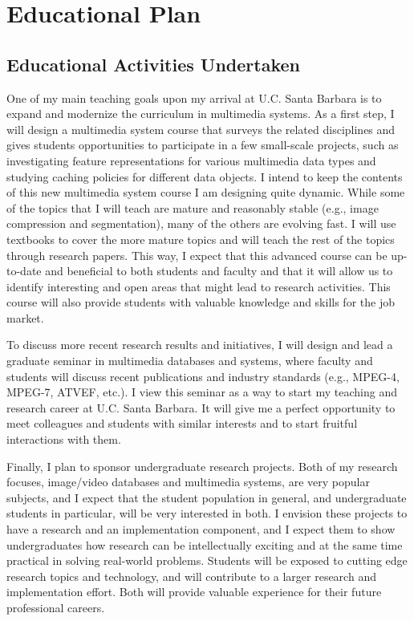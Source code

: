 \section{Educational Plan}

\subsection{Educational Activities Undertaken}

One of my main teaching goals upon my arrival at
U.C. Santa Barbara is to expand and modernize the curriculum in 
multimedia systems. 
As a first step, I will design a multimedia system course
that surveys the related disciplines and gives students opportunities
to participate in a few small-scale projects, such as
investigating feature representations for various multimedia
data types and studying caching policies for different data objects. 
I intend to keep the contents of this new multimedia system 
course I am designing quite dynamic.
While some of the topics that I will teach are mature and 
reasonably stable (e.g., image compression and segmentation), many of the 
others are evolving fast. I will use textbooks to cover the more
mature topics and will teach the rest of the topics through research
papers. This way, I expect that
this advanced course can be up-to-date and
beneficial to both students and faculty and that it will
allow us to identify interesting
and open areas that might lead to research activities. 
This course will also provide students with valuable knowledge
and skills for the job market.

To discuss more recent research results and initiatives, I
will design and lead a graduate seminar in 
multimedia databases and systems, where faculty 
and students will discuss
recent publications and industry standards (e.g., MPEG-4, MPEG-7,
ATVEF, etc.). I view this seminar as a way to start
my teaching and research career at U.C. Santa Barbara.
It will give me a perfect opportunity to meet
colleagues and students with similar interests and to
start fruitful interactions with them.

Finally, I plan to sponsor undergraduate research projects.
Both of my research focuses,
image/video databases and multimedia
systems, are very popular subjects, and I expect that
the student population in general, and undergraduate students
in particular, will be very interested in both. I envision
these projects to have a research and an implementation
component, and I expect them to show undergraduates
how research can be intellectually exciting and at
the same time practical in solving real-world problems. Students
will be exposed to cutting edge research topics and technology,
and will contribute to a larger research and implementation
effort. Both will provide valuable experience
for their future professional careers.

